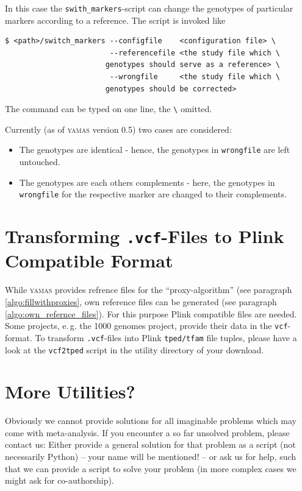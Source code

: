 In this case the \verb+swith_markers+-script can change the genotypes of particular markers according to a reference. The script is invoked like

\begin{lstlisting}[style=shell]
$ <path>/switch_markers --configfile    <configuration file> \
                        --referencefile <the study file which \
                       genotypes should serve as a reference> \
                        --wrongfile     <the study file which \
                       genotypes should be corrected>
\end{lstlisting}

The command can be typed on one line, the \verb+\+ omitted.

Currently (as of \textsc{yamas} version 0.5) two cases are considered:
\begin{itemize}
 \item The genotypes are identical - hence, the genotypes in \verb+wrongfile+ are left untouched.
 \item The genotypes are each others complements - here, the genotypes in \verb+wrongfile+ for the respective marker are changed to their complements.
\end{itemize}

\section{Transforming \texttt{.vcf}-Files to Plink Compatible Format}

While \textsc{yamas} provides refrence files for the ``proxy-algorithm'' (see paragraph \ref{algo:fillwithproxies}, own reference files can be generated (see paragraph \ref{algo:own_refernce_files}). For this purpose Plink \citep{Purcell2007} compatible files are needed. Some projects, e.\,g. the 1000 genomes project, provide their data in the \texttt{vcf}-format. To transform \texttt{.vcf}-files into Plink \texttt{tped/tfam} file tuples, please have a look at the \texttt{vcf2tped} script in the utility directory of your download.  

\section{More Utilities?}

Obviously we cannot provide solutions for all imaginable problems which may come with meta-analysis. If you encounter a so far unsolved problem, please contact us: Either provide a general solution for that problem as a script (not necessarily Python) -- your name will be mentioned! -- or ask us for help, such that we can provide a script to solve your problem (in more complex cases we might ask for co-authorship).


